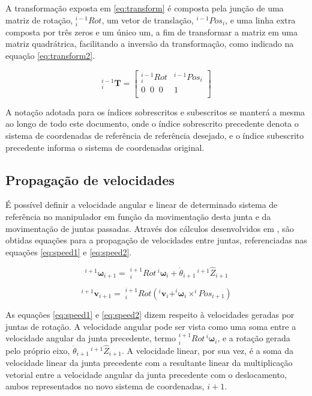 A transformação exposta em \ref{eq:transform} é composta pela junção
de uma matriz de rotação, $^{i-1}_iRot$, um vetor de translação, $^{i-1}Pos_i$,
e uma linha extra composta por três zeros e um único um,
a fim de transformar a matriz em uma matriz quadrátrica, facilitando
a inversão da transformação, como indicado na equação \ref{eq:transform2}. 

\begin{equation}
    \label{eq:transform2}
    ^{i-1}_i \textbf{T} = 
    \begin{bmatrix}
        ^{i-1}_iRot & ^{i-1}Pos_i   \\
        0 \;\; 0 \;\; 0       & 1   \\
    \end{bmatrix}
\end{equation}

A notação adotada para os índices 
sobrescritos e subescritos se manterá a mesma ao longo de todo este
documento, onde o índice sobrescrito precedente denota o sistema de 
coordenadas de referência de referência desejado, e o índice subescrito 
precedente informa o sistema de coordenadas original.

\subsection{Propagação de velocidades}
É possível definir a velocidade angular e linear de determinado 
sistema de referência no manipulador em função da movimentação desta
junta e da movimentação de juntas passadas. Através dos cálculos 
desenvolvidos em \cite{craig2009introduction}, são obtidas 
equações para a propagação de velocidades entre juntas, referenciadas
nas equações \ref{eq:speed1} e \ref{eq:speed2}.

\begin{equation}
    \label{eq:speed1}
    ^{i+1}\boldsymbol{\omega}_{i+1} = \; ^{i+1}_iRot\,^i\boldsymbol{\omega}_i + \dot{\theta}_{i+1}\,^{i+1}\hat{Z}_{i+1}
\end{equation}

\begin{equation}
    \label{eq:speed2}
    ^{i+1}\textbf{v}_{i+1} = \; ^{i+1}_iRot\left(^i\textbf{v}_i+^i\boldsymbol{\omega}_i\times ^iPos_{i+1}\right)
\end{equation}

As equações \ref{eq:speed1} e \ref{eq:speed2} dizem respeito à velocidades
geradas por juntas de rotação. A velocidade angular pode ser vista 
como uma soma entre a velocidade angular da junta precedente, 
termo $^{i+1}_iRot\,^i\boldsymbol{\omega}_i$, e a rotação gerada pelo próprio eixo,
$\dot{\theta}_{i+1}\,^{i+1}\hat{Z}_{i+1}$. 
A velocidade linear, por sua vez, é a soma da velocidade linear da 
junta precedente com a resultante linear da multiplicação vetorial
entre a velocidade angular da junta precedente com o deslocamento, 
ambos representados no novo sistema de coordenadas, $i+1$.


